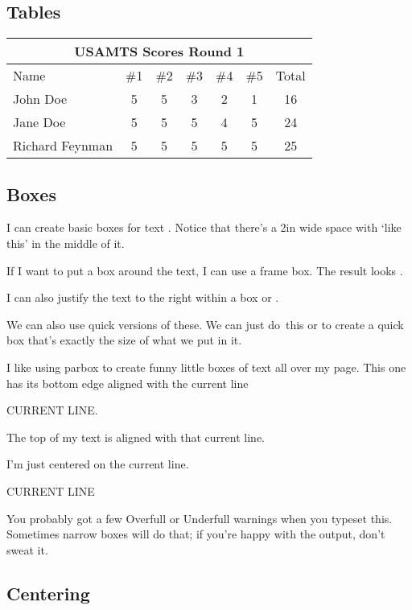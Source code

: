 \documentclass{article}
\begin{document}
\subsection{Tables}

\begin{tabular}[t]{|l|ccccc|c|}
\multicolumn{7}{c}{USAMTS Scores Round 1}\\\hline
Name&\#1&\#2&\#3&\#4&\#5&Total\\\hline
John Doe&5&5&3&2&1&16\\
Jane Doe&5&5&5&4&5&24\\
Richard Feynman&5&5&5&5&5&25\\\hline
\end{tabular}

\subsection{Boxes}

I can create basic boxes for text . Notice
that there's a 2in wide space with `like this' in the middle of it.

If I want to put a box around the text, I can use a frame box. The
result looks .

I can also justify the text to the right within a box
 or .

We can also use quick versions of these. We can just \mbox{do this}
or  to create a quick box that's exactly the size of what we put in it.

\parbox[b]{2in}{I like using parbox to create funny little boxes of
text all over my page. This one has its bottom edge aligned with the
current line}
CURRENT LINE.
\parbox[t]{2in}{The top of my text is aligned with that current
line.}

\parbox{1.5in}{I'm just centered on the current line.} CURRENT LINE
\parbox{2.5in}{You probably got a few Overfull or Underfull warnings
when you typeset this. Sometimes narrow boxes will do that; if you're
happy with the output, don't sweat it.}

\subsection{Centering}
\end{document}
